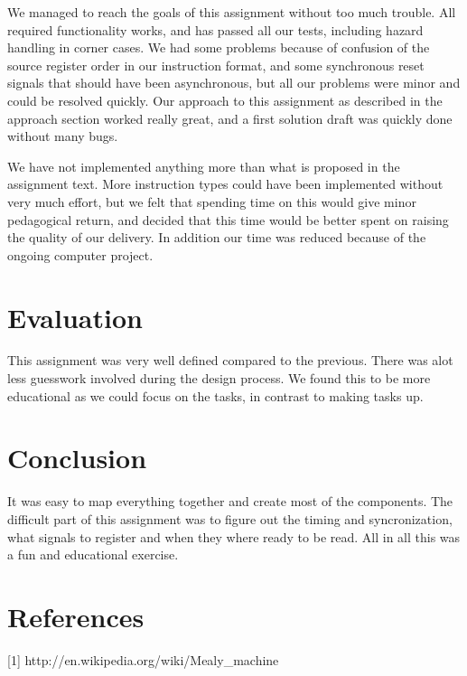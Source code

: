 \documentclass[11pt]{report}
\begin{document}

We managed to reach the goals of this assignment without too much trouble.
All required functionality works, and has passed all our tests, including
hazard handling in corner cases. We had some problems because of confusion
of the source register order in our instruction format, and some synchronous
reset signals that should have been asynchronous, but all our problems were 
minor and could be resolved quickly. Our approach to this assignment as described
in the approach section worked really great, and a first solution draft was 
quickly done without many bugs. 

We have not implemented anything more than what is proposed in the assignment
text. More instruction types could have been implemented without very much effort,
but we felt that spending time on this would give minor pedagogical return, 
and decided that this time would be better spent on raising the quality of our
delivery. In addition our time was reduced because of the ongoing computer
project.


\section*{Evaluation}


This assignment was very well defined compared to the previous. There was
alot less guesswork involved during the design process. We found this to
be more educational as we could focus on the tasks, in contrast to
making tasks up.

\section*{Conclusion}


It was easy to map everything together and create most of the components. 
The difficult part of this assignment was to figure out the timing 
and syncronization, what signals to register and when they where 
ready to be read. All in all this was a fun and educational exercise.

\section*{References}

[1] http://en.wikipedia.org/wiki/Mealy\_machine
\end{document}
